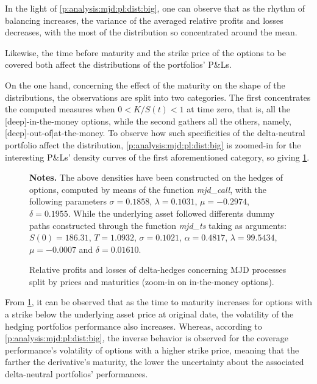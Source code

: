 \documentclass[12pt,a4paper]{report}
\begin{document}
In the light of \cref{p:analysis:mjd:pl:dist:big}, one can observe that as the rhythm of balancing increases, the variance of the averaged relative profits and losses decreases, with the most of the distribution so concentrated around the mean.

Likewise,  the time before maturity and the strike price of the options to be covered both affect the distributions of the portfolios' P\&Ls.
%

On the one hand, concerning the effect of the maturity on the shape of the distributions, the observations are split into two categories.
The first concentrates the computed measures when $0 < K/S(t) < 1$ at time zero, that is, all the [deep]-in-the-money options, while the second gathers all the others, namely, [deep]-out-of|at-the-money. 
To observe how such specificities of the delta-neutral portfolio affect the distribution, \cref{p:analysis:mjd:pl:dist:big} is zoomed-in for the interesting P\&Ls' density curves of the first aforementioned category, so giving \cref{p:analysis:mjd:pl:dist:in}.


\begin{figure}[h]
  \centering
  
  \caption{Relative profits and losses of delta-hedges concerning MJD processes split by prices and maturities (zoom-in on in-the-money options).}
  \begin{changemargin}{0.5cm}{0.5cm}
  \medskip
\footnotesize
{}\textbf{Notes.} The above densities have been constructed on the hedges of options, computed by means of the function \textit{mjd\_call}, with the following parameters $\sigma = 0.1858$, $\lambda = 0.1031$, $\mu = -0.2974$, $\delta = 0.1955$. While the underlying asset followed differents dummy paths constructed through the function \textit{mjd\_ts} taking as arguments: $S(0) = 186.31$, $T = 1.0932$, $\sigma = 0.1021$, $\alpha = 0.4817$, $\lambda = 99.5434$, $\mu = -0.0007$ and $\delta = 0.01610$. 
  \end{changemargin}
  \label{p:analysis:mjd:pl:dist:in}
\end{figure}

From \cref{p:analysis:mjd:pl:dist:in}, it can be observed that as the time to maturity increases for options with a strike below the underlying asset price at original date, the volatility of the hedging portfolios performance also increases.
Whereas, according to \cref{p:analysis:mjd:pl:dist:big}, the inverse behavior is observed for the coverage performance's volatility of options with a higher strike price, meaning that the farther the derivative's maturity, the lower the uncertainty about the associated delta-neutral portfolios' performances.
\end{document}
